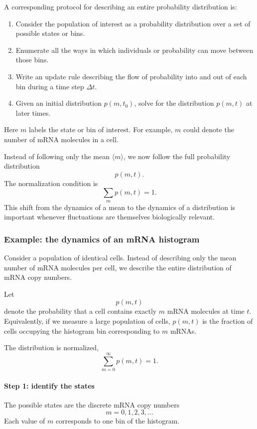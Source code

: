 A corresponding protocol for describing an entire probability distribution is:

\begin{enumerate}
    \item Consider the population of interest as a probability distribution over a set of possible states or bins.
    \item Enumerate all the ways in which individuals or probability can move between those bins.
    \item Write an update rule describing the flow of probability into and out of each bin during a time step $\Delta t$.
    \item Given an initial distribution $p(m,t_0)$, solve for the distribution $p(m,t)$ at later times.
\end{enumerate}

Here $m$ labels the state or bin of interest.
For example, $m$ could denote the number of mRNA molecules in a cell.

Instead of following only the mean
$\langle m\rangle$,
we now follow the full probability distribution
\[
    p(m,t).
\]
The normalization condition is
\[
    \sum_m p(m,t)=1.
\]
This shift from the dynamics of a mean to the dynamics of a distribution is important whenever fluctuations are themselves biologically relevant.

\subsubsection{Example: the dynamics of an mRNA histogram}

Consider a population of identical cells.
Instead of describing only the mean number of mRNA molecules per cell, we describe the entire distribution of mRNA copy numbers.

Let
\[
    p(m,t)
\]
denote the probability that a cell contains exactly $m$ mRNA molecules at time $t$.
Equivalently, if we measure a large population of cells, $p(m,t)$ is the fraction of cells occupying the histogram bin corresponding to $m$ mRNAs.

The distribution is normalized,
\[
    \sum_{m=0}^{\infty}p(m,t)=1.
\]
\paragraph{Step 1: identify the states}
The possible states are the discrete mRNA copy numbers
\[
    m=0,1,2,3,\ldots
\]
Each value of $m$ corresponds to one bin of the histogram.
